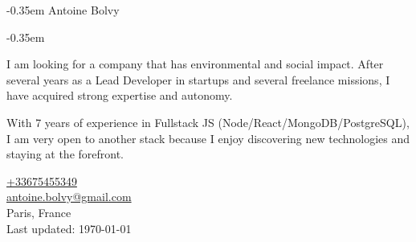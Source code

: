 \documentclass[
  english,
  a4paper
]{resume-openfont}
\begin{document}
\noindent%
\begin{minipage}{.7\textwidth}
\kern-0.35em
{
  \fontsize{24}{24}
  \selectfont Antoine Bolvy\\
}

\kern-0.35em
{
  \parskip2pt
  \fontsize{8pt}{10pt}
  \selectfont I am looking for a company that has environmental and social impact. After several years as a Lead Developer in startups and several freelance missions, I have acquired strong expertise and autonomy.\par
  With 7 years of experience in Fullstack JS (Node/React/MongoDB/PostgreSQL), I am very open to another stack because I enjoy discovering new technologies and staying at the forefront.
}%
\vspace{8pt}


\end{minipage}%
\begin{minipage}{.3\textwidth}
\begin{flushright}
\color{headings}\href{tel:+33675455349}{+33675455349}\\
\href{mailto:antoine.bolvy@gmail.com}{antoine.bolvy@gmail.com}\\
Paris, France\\
{\color{date}\fontsize{7pt}{12pt}\selectfont{}Last updated: \today}
\end{flushright}
\end{minipage}

\noindent\makebox[\linewidth]{
{\color{headingsrulegray}\rule{\paperwidth}{0.4pt}}}
\vspace{-18pt}

%
%
\end{document}
